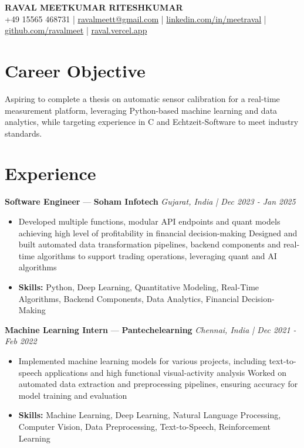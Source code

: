 \documentclass[a4paper,10pt]{article}
\begin{document}
\begin{center}
  {\Large\bfseries RAVAL MEETKUMAR RITESHKUMAR}\\[2pt]
  {\small +49 15565 468731 \;|\; \href{mailto:ravalmeett@gmail.com}{ravalmeett@gmail.com} \;|\; \href{https://www.linkedin.com/in/meetraval/}{linkedin.com/in/meetraval} \;|\; \href{https://github.com/ravalmeet}{github.com/ravalmeet} \;|\; \href{https://raval.vercel.app/}{raval.vercel.app}}
\end{center}
\vspace{-3pt}

\section*{Career Objective}
Aspiring to complete a thesis on automatic sensor calibration for a real-time measurement platform, leveraging Python-based machine learning and data analytics, while targeting experience in C and Echtzeit-Software to meet industry standards.\par

\section*{Experience}
\textbf{Software Engineer} — \textbf{Soham Infotech} \hfill \textit{Gujarat, India \;|\; Dec 2023 - Jan 2025}\par
\vspace{1pt}
\begin{itemize}
  \item Developed multiple functions, modular API endpoints and quant models achieving high level of profitability in financial decision-making Designed and built automated data transformation pipelines, backend components and real-time algorithms to support trading operations, leveraging quant and AI algorithms
  \item \textbf{Skills:} Python, Deep Learning, Quantitative Modeling, Real-Time Algorithms, Backend Components, Data Analytics, Financial Decision-Making
\end{itemize}
\vspace{3pt}
\textbf{Machine Learning Intern} — \textbf{Pantechelearning} \hfill \textit{Chennai, India \;|\; Dec 2021 - Feb 2022}\par
\vspace{1pt}
\begin{itemize}
  \item Implemented machine learning models for various projects, including text-to-speech applications and high functional visual-activity analysis Worked on automated data extraction and preprocessing pipelines, ensuring accuracy for model training and evaluation
  \item \textbf{Skills:} Machine Learning, Deep Learning, Natural Language Processing, Computer Vision, Data Preprocessing, Text-to-Speech, Reinforcement Learning
\end{itemize}
\end{document}
